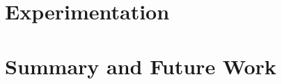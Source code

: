
\section{Experimentation}
\label{s,mwf,exp}


\section{Summary and Future Work}
\label{s,mwf,summ}

